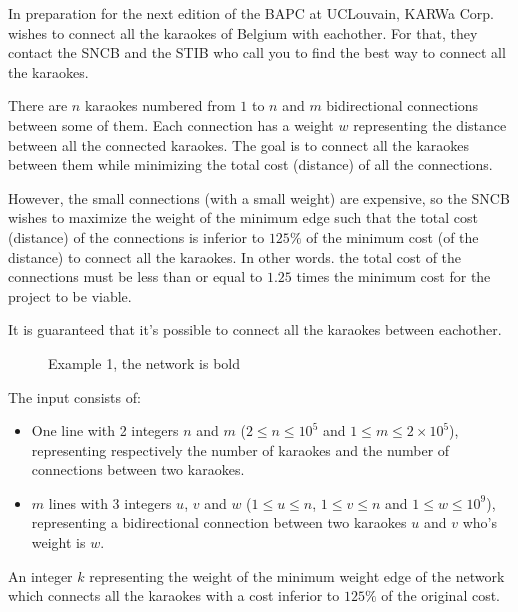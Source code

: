\problemname{\problemyamlname}


In preparation for the next edition of the BAPC at UCLouvain, KARWa Corp. wishes to connect all the karaokes of Belgium with eachother.
For that, they contact the SNCB and the STIB who call you to find the best way to connect all the karaokes.

There are $n$ karaokes numbered from $1$ to $n$ and $m$ bidirectional connections between some of them.
Each connection has a weight $w$ representing the distance between all the connected karaokes.
The goal is to connect all the karaokes between them while minimizing the total cost (distance) of all the connections.

However, the small connections (with a small weight) are expensive, so the SNCB wishes to maximize the weight of the minimum edge such that the total cost (distance) of the connections is inferior to $125\%$ of the minimum cost (of the distance) to connect all the karaokes.
In other words. the total cost of the connections must be less than or equal to $1.25$ times the minimum cost for the project to be viable.

It is guaranteed that it's possible to connect all the karaokes between eachother.

\begin{figure}[h]
	\centering
	  \caption[]{Example 1, the network is bold}
\end{figure}

\begin{Input}
	The input consists of:
	\begin{itemize}
		\item One line with 2 integers $n$ and $m$ ($2 \le n \le 10^5$ and $1 \le m \le 2 \times 10^5$), representing respectively the number of karaokes and the number of connections between two karaokes.
		\item $m$ lines with 3 integers $u$, $v$ and $w$ ($1 \le u \le n$, $1 \le v \le n$ and $1 \le w \le 10^9$), representing a bidirectional connection between two karaokes $u$ and $v$ who's weight is $w$.
	\end{itemize}
\end{Input}

\begin{Output}
	An integer $k$ representing the weight of the minimum weight edge of the network which connects all the karaokes with a cost inferior to $125\%$ of the original cost.
\end{Output}

